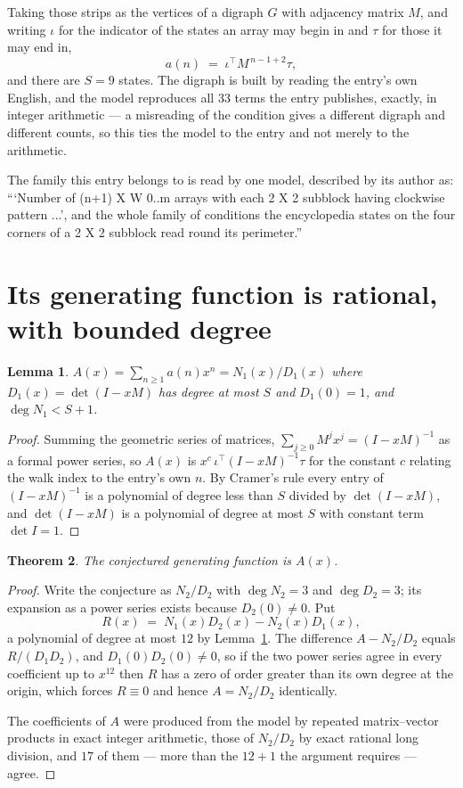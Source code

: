 \documentclass[11pt,a4paper]{article}
\theoremstyle{plain}
\newtheorem{theorem}{Theorem}
\newtheorem{lemma}[theorem]{Lemma}
\theoremstyle{definition}
\begin{document}
Taking those strips as the vertices of a digraph $G$ with adjacency matrix $M$, and writing
$\iota$ for the indicator of the states an array may begin in and $\tau$ for those it may end
in,
\[
a(n)\;=\;\iota^{\!\top}M^{\,n-1+2}\tau ,
\]
and there are $S=9$ states. The digraph is built by reading the entry's own English, and the
model reproduces all $33$ terms the entry publishes, exactly, in integer arithmetic --- a
misreading of the condition gives a different digraph and different counts, so this ties the
model to the entry and not merely to the arithmetic.

The family this entry belongs to is read by one model, described by its author as: ```Number of (n+1) X W 0..m arrays with each 2 X 2 subblock having clockwise pattern ...', and the whole family of conditions the encyclopedia states on the four corners of a 2 X 2 subblock read round its perimeter.''


\section{Its generating function is rational, with bounded degree}

\begin{lemma}\label{lem:rat}
$A(x)=\sum_{n\ge1}a(n)x^n=N_1(x)/D_1(x)$ where $D_1(x)=\det(I-xM)$ has degree at most
$S$ and $D_1(0)=1$, and $\deg N_1<S+1$.
\end{lemma}

\begin{proof}
Summing the geometric series of matrices, $\sum_{j\ge0}M^jx^j=(I-xM)^{-1}$ as a formal
power series, so $A(x)$ is $x^{c}\,\iota^{\!\top}(I-xM)^{-1}\tau$ for the constant $c$
relating the walk index to the entry's own $n$. By Cramer's rule every entry of
$(I-xM)^{-1}$ is a polynomial of degree less than $S$ divided by $\det(I-xM)$, and
$\det(I-xM)$ is a polynomial of degree at most $S$ with constant term $\det I=1$.
\end{proof}

\begin{theorem}
The conjectured generating function is $A(x)$.
\end{theorem}

\begin{proof}
Write the conjecture as $N_2/D_2$ with $\deg N_2=3$ and $\deg D_2=3$; its expansion as a
power series exists because $D_2(0)\neq0$. Put
\[
R(x)\;=\;N_1(x)D_2(x)-N_2(x)D_1(x),
\]
a polynomial of degree at most $12$ by Lemma~\ref{lem:rat}. The difference
$A-N_2/D_2$ equals $R/(D_1D_2)$, and $D_1(0)D_2(0)\neq0$, so if the two power series agree in
every coefficient up to $x^{12}$ then $R$ has a zero of order greater than its own
degree at the origin, which forces $R\equiv0$ and hence $A=N_2/D_2$ identically.

The coefficients of $A$ were produced from the model by repeated matrix--vector products in
exact integer arithmetic, those of $N_2/D_2$ by exact rational long division, and $17$
of them --- more than the $12+1$ the argument requires --- agree.
\end{proof}
\end{document}
